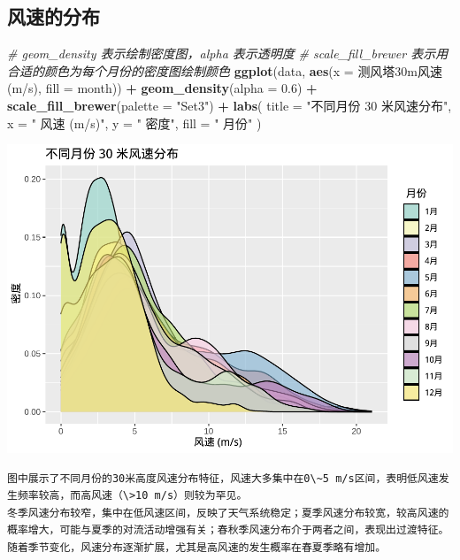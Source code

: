 \documentclass[
]{ctexart}
\newenvironment{Shaded}{\begin{snugshade}}{\end{snugshade}}
\newcommand{\AttributeTok}[1]{\textcolor[rgb]{0.13,0.29,0.53}{#1}}
\newcommand{\CommentTok}[1]{\textcolor[rgb]{0.56,0.35,0.01}{\textit{#1}}}
\newcommand{\FloatTok}[1]{\textcolor[rgb]{0.00,0.00,0.81}{#1}}
\newcommand{\FunctionTok}[1]{\textcolor[rgb]{0.13,0.29,0.53}{\textbf{#1}}}
\newcommand{\NormalTok}[1]{#1}
\newcommand{\SpecialCharTok}[1]{\textcolor[rgb]{0.81,0.36,0.00}{\textbf{#1}}}
\newcommand{\StringTok}[1]{\textcolor[rgb]{0.31,0.60,0.02}{#1}}
\begin{document}
\subsection{风速的分布}\label{ux98ceux901fux7684ux5206ux5e03}

\begin{Shaded}
\begin{Highlighting}[]
\CommentTok{\# geom\_density 表示绘制密度图，alpha 表示透明度}
\CommentTok{\# scale\_fill\_brewer 表示用合适的颜色为每个月份的密度图绘制颜色}
\FunctionTok{ggplot}\NormalTok{(data, }\FunctionTok{aes}\NormalTok{(}\AttributeTok{x =} \StringTok{\textasciigrave{}}\AttributeTok{测风塔30m风速(m/s)}\StringTok{\textasciigrave{}}\NormalTok{, }\AttributeTok{fill =}\NormalTok{ month)) }\SpecialCharTok{+}
\FunctionTok{geom\_density}\NormalTok{(}\AttributeTok{alpha =} \FloatTok{0.6}\NormalTok{) }\SpecialCharTok{+}
\FunctionTok{scale\_fill\_brewer}\NormalTok{(}\AttributeTok{palette =} \StringTok{"Set3"}\NormalTok{) }\SpecialCharTok{+}
\FunctionTok{labs}\NormalTok{(}
\AttributeTok{title =} \StringTok{"不同月份 30 米风速分布"}\NormalTok{,}
\AttributeTok{x =} \StringTok{" 风速 (m/s)"}\NormalTok{,}
\AttributeTok{y =} \StringTok{" 密度"}\NormalTok{,}
\AttributeTok{fill =} \StringTok{" 月份"}
\NormalTok{)}
\end{Highlighting}
\end{Shaded}

\includegraphics{1_files/figure-latex/unnamed-chunk-5-1.pdf}

\begin{verbatim}
图中展示了不同月份的30米高度风速分布特征，风速大多集中在0\~5 m/s区间，表明低风速发生频率较高，而高风速（\>10 m/s）则较为罕见。
冬季风速分布较窄，集中在低风速区间，反映了天气系统稳定；夏季风速分布较宽，较高风速的概率增大，可能与夏季的对流活动增强有关；春秋季风速分布介于两者之间，表现出过渡特征。
随着季节变化，风速分布逐渐扩展，尤其是高风速的发生概率在春夏季略有增加。
\end{verbatim}
\end{document}
